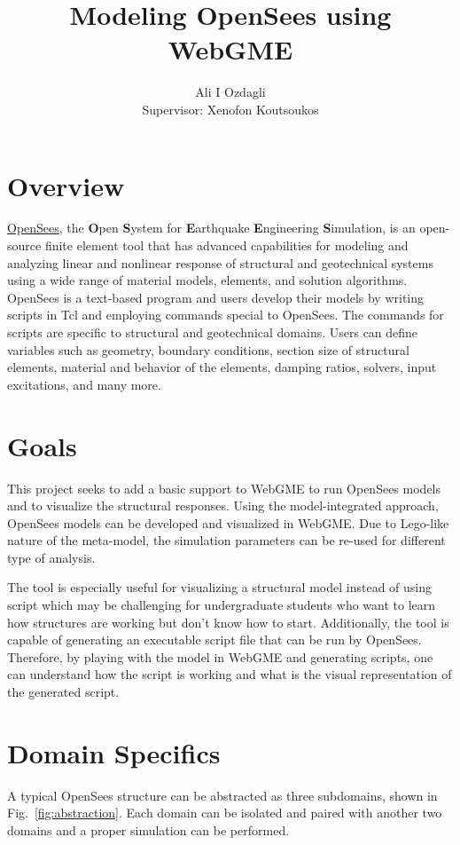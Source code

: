 \documentclass[letterpaper]{article}
\title{Modeling OpenSees using WebGME}
\author{Ali I Ozdagli \\
{Supervisor: Xenofon Koutsoukos}}
\begin{document}
	
	\maketitle

	\section*{Overview}
	\href{http://opensees.berkeley.edu/index.php}{OpenSees}, the \textbf{O}pen \textbf{S}ystem for \textbf{E}arthquake \textbf{E}ngineering \textbf{S}imulation, is an open-source finite element tool that has advanced capabilities for modeling and analyzing linear and nonlinear response of structural and geotechnical systems using a wide range of material models, elements, and solution algorithms. OpenSees is a text-based program and users develop their models by writing scripts in Tcl and employing commands special to OpenSees. The commands for scripts are specific to structural and geotechnical domains. Users can define variables such as geometry, boundary conditions, section size of structural elements, material and behavior of the elements, damping ratios, solvers, input excitations, and many more.
	
	\section*{Goals}
	This project seeks to add a basic support to WebGME to run OpenSees models and to visualize the structural responses. Using the model-integrated approach, OpenSees models can be developed and visualized in WebGME. Due to Lego-like nature of the meta-model, the simulation parameters can be re-used for different type of analysis. 
	
	The tool is especially useful for visualizing a structural model instead of using script which may be challenging for undergraduate students who want to learn how structures are working but don't know how to start. Additionally, the tool is capable of generating an executable script file that can be run by OpenSees. Therefore, by playing with the model in WebGME and generating scripts, one can understand how the script is working and what is the visual representation of the generated script.
	
	\section*{Domain Specifics}
	A typical OpenSees structure can be abstracted as three subdomains, shown in Fig.~\ref{fig:abstraction}. Each domain can be isolated and paired with another two domains and a proper simulation can be performed. 
	
\end{document}
